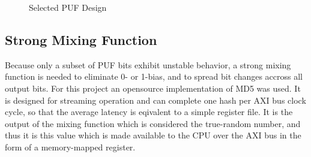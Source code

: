 \documentclass[journal]{IEEEtran}
\begin{document}
\begin{figure}
 \centering
  \caption{Selected PUF Design}
  \label{fig:design}
\vspace{-5mm}
\end{figure}

\subsection{Strong Mixing Function}

Because only a subset of PUF bits exhibit unstable behavior, a strong mixing function is needed to eliminate 0- or 1-bias, and to spread bit changes accross all output bits. For this project an opensource implementation of MD5 was used. It is designed for streaming operation and can complete one hash per AXI bus clock cycle, so that the average latency is eqivalent to a simple register file. It is the output of the mixing function which is considered the true-random number, and thus it is this value which is made available to the CPU over the AXI bus in the form of a memory-mapped register.  
\end{document}
